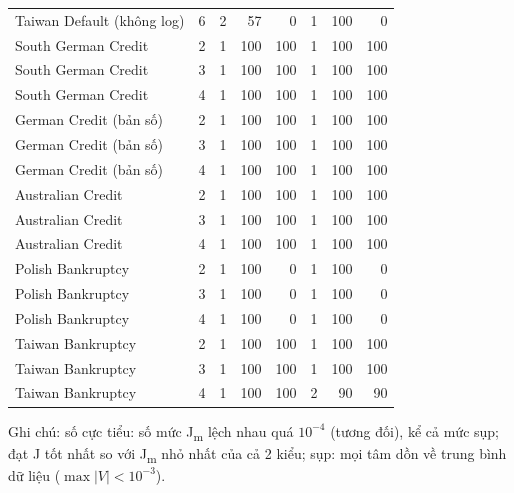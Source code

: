 \begin{table}[htbp]
\begin{tabular}{@{}lrrrrrrr@{}}
Taiwan Default (không log) & 6 & 2 & 57 & 0 & 1 & 100 & 0 \\
South German Credit & 2 & 1 & 100 & 100 & 1 & 100 & 100 \\
South German Credit & 3 & 1 & 100 & 100 & 1 & 100 & 100 \\
South German Credit & 4 & 1 & 100 & 100 & 1 & 100 & 100 \\
German Credit (bản số) & 2 & 1 & 100 & 100 & 1 & 100 & 100 \\
German Credit (bản số) & 3 & 1 & 100 & 100 & 1 & 100 & 100 \\
German Credit (bản số) & 4 & 1 & 100 & 100 & 1 & 100 & 100 \\
Australian Credit & 2 & 1 & 100 & 100 & 1 & 100 & 100 \\
Australian Credit & 3 & 1 & 100 & 100 & 1 & 100 & 100 \\
Australian Credit & 4 & 1 & 100 & 100 & 1 & 100 & 100 \\
Polish Bankruptcy & 2 & 1 & 100 & 0 & 1 & 100 & 0 \\
Polish Bankruptcy & 3 & 1 & 100 & 0 & 1 & 100 & 0 \\
Polish Bankruptcy & 4 & 1 & 100 & 0 & 1 & 100 & 0 \\
Taiwan Bankruptcy & 2 & 1 & 100 & 100 & 1 & 100 & 100 \\
Taiwan Bankruptcy & 3 & 1 & 100 & 100 & 1 & 100 & 100 \\
Taiwan Bankruptcy & 4 & 1 & 100 & 100 & 2 & 90 & 90 \\
\bottomrule
\end{tabular}
\par\smallskip\parbox{\linewidth}{\scriptsize Ghi chú: số cực tiểu: số mức J\textsubscript{m} lệch nhau quá $10^{-4}$ (tương đối), kể cả mức sụp; đạt J tốt nhất so với J\textsubscript{m} nhỏ nhất của cả 2 kiểu; sụp: mọi tâm dồn về trung bình dữ liệu ($\max|V| < 10^{-3}$).}
\end{table}
